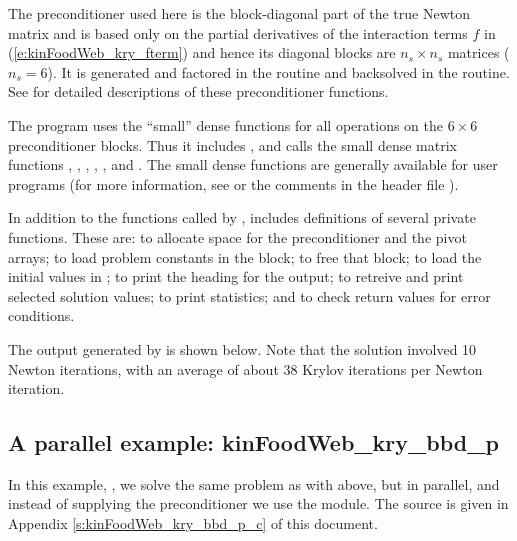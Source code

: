 The preconditioner used here is the block-diagonal part of the true Newton
matrix and is based only on the partial derivatives of the interaction terms $f$
in (\ref{e:kinFoodWeb_kry_fterm}) and hence its  diagonal blocks are $n_s \times n_s$ matrices
($n_s = 6$).
It is generated and factored in the  routine and
backsolved in the  routine.  
See  for detailed descriptions
of these preconditioner functions.

The program  uses the ``small'' dense functions for all operations 
on the $6 \times 6$ preconditioner blocks.  
Thus it includes , and calls the small dense matrix
functions , , 
, , , and .
The small dense functions are generally available for {\kinsol} user programs
(for more information, see  or the comments in the header file
).

In addition to the functions called by {\kinsol},  includes
definitions of several private functions.  These are: 
to allocate space for the preconditioner and the pivot arrays; 
to load problem constants in the  block;  to free
that block;  to load the initial values in ;
 to print the heading for the output;
 to retreive and print selected solution values;
 to print statistics; and 
to check return values for error conditions.

The output generated by  is shown below.  Note that the
solution involved 10 Newton iterations, with an average of about 38
Krylov iterations per Newton iteration.



\subsection{A parallel example: kinFoodWeb\_kry\_bbd\_p}\label{ss:kinFoodWeb_kry_bbd_p}

In this example, , we solve the same
problem as with  above, but in parallel, and
instead of supplying the preconditioner we use the {\kinbbdpre} module.  
The source is given in Appendix \ref{s:kinFoodWeb_kry_bbd_p_c} of this
document.

